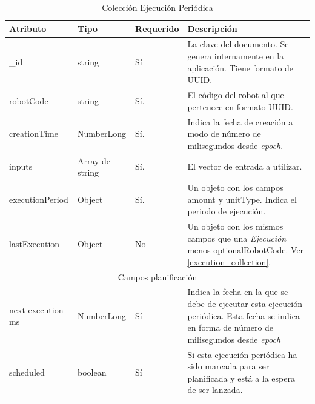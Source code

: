 \begin{table}[hbp]
\begin{tabularx}{\textwidth}{|l|l|l|X|}
\hline
Atributo & Tipo & Requerido & Descripción \\ \hline
\_id & string & Sí & La clave del documento. Se genera internamente en la
aplicación. Tiene formato de UUID. \\ \hline
robotCode & string & Sí. & El código del robot al que
pertenece en formato UUID. \\ \hline
creationTime & NumberLong & Sí. & Indica la fecha de creación a modo de
número de milisegundos desde \emph{epoch}. \\ \hline
inputs & Array de string & Sí. & El vector de entrada a
utilizar. \\ \hline
executionPeriod & Object & Sí. & Un objeto con los campos amount y
unitType. Indica el periodo de ejecución.\\ \hline
lastExecution & Object & No & Un objeto con los mismos campos que una
\emph{Ejecución} menos optionalRobotCode. Ver
\ref{execution_collection}. \\ \hline
\multicolumn{4}{c}{Campos planificación} \\ \hline
next-execution-ms & NumberLong & Sí & Indica la fecha en la que se
debe de ejecutar esta ejecución periódica. Esta fecha se indica en
forma de número de milisegundos desde \emph{epoch}\\ \hline
scheduled & boolean & Sí & Si esta ejecución periódica ha sido marcada
para ser planificada y está a la espera de ser lanzada.\\ \hline
\end{tabularx}
\caption{Colección Ejecución Periódica}
\label{periodical_execution_collection}
\end{table}
